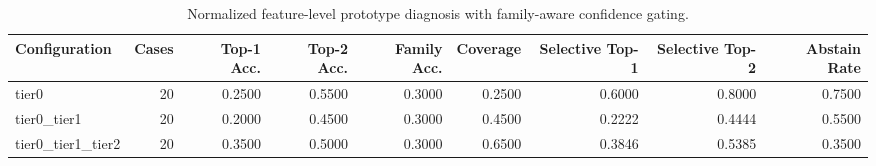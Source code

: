 \begin{table}[t]
\centering
\caption{Normalized feature-level prototype diagnosis with family-aware confidence gating.}
\label{tab:dice_stressor_hierarchical_diagnosis}
\footnotesize
\begin{tabular}{lrrrrrrrr}
\toprule
Configuration & Cases & Top-1 Acc. & Top-2 Acc. & Family Acc. & Coverage & Selective Top-1 & Selective Top-2 & Abstain Rate \\
\midrule
tier0 & 20 & 0.2500 & 0.5500 & 0.3000 & 0.2500 & 0.6000 & 0.8000 & 0.7500 \\
tier0_tier1 & 20 & 0.2000 & 0.4500 & 0.3000 & 0.4500 & 0.2222 & 0.4444 & 0.5500 \\
tier0_tier1_tier2 & 20 & 0.3500 & 0.5000 & 0.3000 & 0.6500 & 0.3846 & 0.5385 & 0.3500 \\
\bottomrule
\end{tabular}

\end{table}
